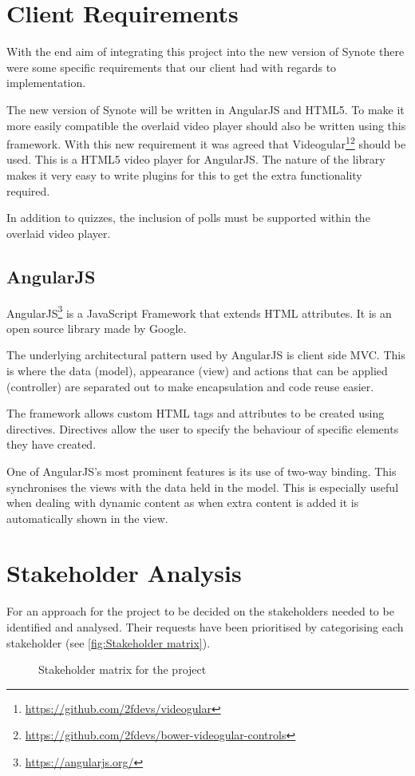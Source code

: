\section{Client Requirements}
With the end aim of integrating this project into the new version of Synote there were some specific requirements that our client had with regards to implementation.

The new version of Synote will be written in AngularJS and HTML5. To make it more easily compatible the overlaid video player should also be written using this framework. With this new requirement it was agreed that \gls{Videogular}\footnote{\url{https://github.com/2fdevs/videogular}}\footnote{\url{https://github.com/2fdevs/bower-videogular-controls}} should be used. This is a HTML5 video player for \gls{AngularJS}. The nature of the library makes it very easy to write plugins for this to get the extra functionality required.

In addition to quizzes, the inclusion of polls must be supported within the overlaid video player.

\subsection{AngularJS}
\label{Section:AngularJS}
\gls{AngularJS}\footnote{\url{https://angularjs.org/}} is a JavaScript Framework that extends HTML attributes. It is an open source library made by Google.

The underlying architectural pattern used by \gls{AngularJS} is client side \gls{MVC}. This is where the data (model), appearance (view) and actions that can be applied (controller) are separated out to make encapsulation and code reuse easier. 

The framework allows custom HTML tags and attributes to be created using directives. Directives allow the user to specify the behaviour of specific elements they have created.

One of \gls{AngularJS}'s most prominent features is its use of two-way binding. This synchronises the views with the data held in the model. This is especially useful when dealing with dynamic content as when extra content is added it is automatically shown in the view.

\section{Stakeholder Analysis}
For an approach for the project to be decided on the stakeholders needed to be identified and analysed. Their requests have been prioritised by categorising each stakeholder (see \autoref{fig:Stakeholder matrix}).
\begin{figure}[h!]
\centering

\caption{Stakeholder matrix for the project\label{fig:Stakeholder matrix}}
\end{figure}

